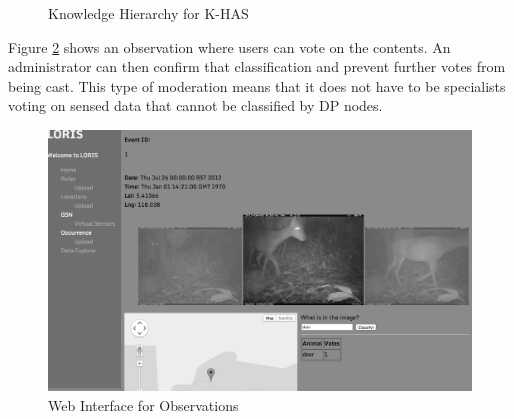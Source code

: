 		\begin{figure}[!h]
			\centering
			\caption{Knowledge Hierarchy for K-HAS}
			\label{arch:kno:hier}
		\end{figure}

		Figure \ref{kc:loris} shows an observation where users can vote on the contents. An administrator can then confirm that classification and prevent further votes from being cast. This type of moderation means that it does not have to be specialists voting on sensed data that cannot be classified by DP nodes.

		\begin{figure}[h]
		\centering
		\includegraphics[width=\textwidth]{Chap4/figures/loris}
		\caption{Web Interface for Observations}
		\label{kc:loris}
		\end{figure}

